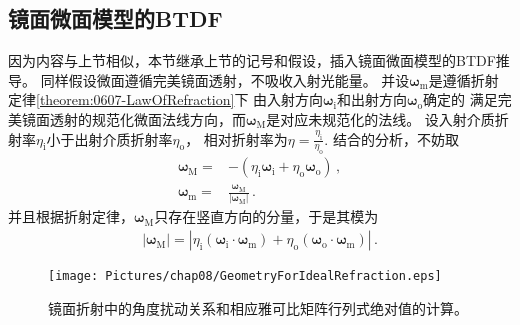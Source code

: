 \subsection{镜面微面模型的BTDF}\label{sub:镜面微面模型的BTDF}
因为内容与上节相似，本节继承上节的记号和假设，插入镜面微面模型的BTDF推导。
同样假设微面遵循完美镜面透射，不吸收入射光能量。
并设${\bm\omega}_{\mathrm{m}}$是遵循折射定律\ref{theorem:0607-LawOfRefraction}下
由入射方向${\bm\omega}_{\mathrm{i}}$和出射方向${\bm\omega}_{\mathrm{o}}$确定的
满足完美镜面透射的规范化微面法线方向，而${\bm\omega}_{\mathrm{M}}$是对应未规范化的法线。
设入射介质折射率$\eta_{\mathrm{i}}$小于出射介质折射率$\eta_{\mathrm{o}}$，
相对折射率为$\displaystyle\eta=\frac{\eta_{\mathrm{i}}}{\eta_{\mathrm{o}}}$.
结合的分析，不妨取
\begin{align}
    {\bm\omega}_{\mathrm{M}}=&-(\eta_{\mathrm{i}}{\bm\omega}_{\mathrm{i}}+\eta_{\mathrm{o}}{\bm\omega}_{\mathrm{o}})\, ,\\
    {\bm\omega}_{\mathrm{m}}=&\frac{{\bm\omega}_{\mathrm{M}}}{|{\bm\omega}_{\mathrm{M}}|}\, .
\end{align}
并且根据折射定律，${\bm\omega}_{\mathrm{M}}$只存在竖直方向的分量，于是其模为
\begin{align}
    |{\bm\omega}_{\mathrm{M}}|=|\eta_{\mathrm{i}}({\bm\omega}_{\mathrm{i}}\cdot{\bm\omega}_{\mathrm{m}})
    +\eta_{\mathrm{o}}({\bm\omega}_{\mathrm{o}}\cdot{\bm\omega}_{\mathrm{m}})|\, .
\end{align}
\begin{figure}[htbp]
    \centering
    \texttt{[image: Pictures/chap08/GeometryForIdealRefraction.eps]}
    \caption{镜面折射中的角度扰动关系和相应雅可比矩阵行列式绝对值的计算。}
    \label{fig:08ex01-GeometryForIdealRefraction}
\end{figure}

